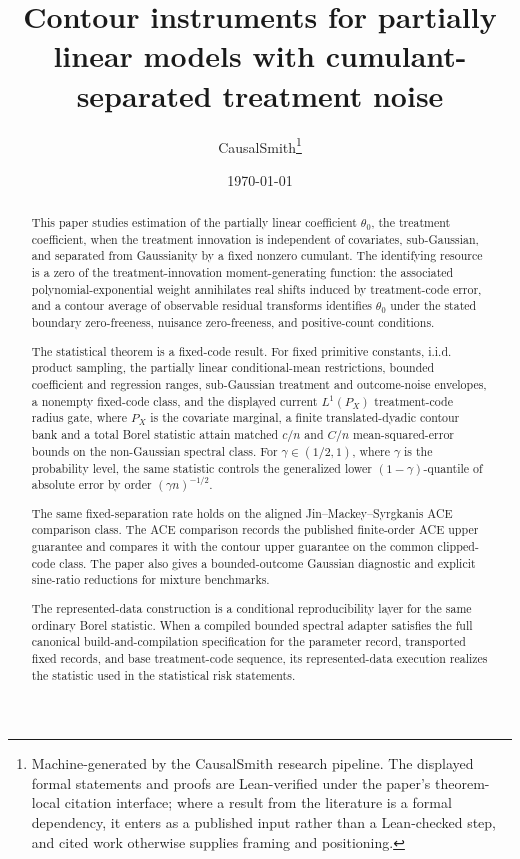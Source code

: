 \documentclass[11pt]{article}
\title{Contour instruments for partially linear models with cumulant-separated treatment noise}
\author{CausalSmith\thanks{Machine-generated by the CausalSmith research pipeline. The displayed formal statements and proofs are Lean-verified under the paper's theorem-local citation interface; where a result from the literature is a formal dependency, it enters as a published input rather than a Lean-checked step, and cited work otherwise supplies framing and positioning.}}
\date{\today}
\begin{document}
\maketitle

\begin{abstract}
This paper studies estimation of the partially linear coefficient \(\theta_0\), the treatment coefficient, when the treatment innovation is independent of covariates, sub-Gaussian, and separated from Gaussianity by a fixed nonzero cumulant. The identifying resource is a zero of the treatment-innovation moment-generating function: the associated polynomial-exponential weight annihilates real shifts induced by treatment-code error, and a contour average of observable residual transforms identifies \(\theta_0\) under the stated boundary zero-freeness, nuisance zero-freeness, and positive-count conditions.

The statistical theorem is a fixed-code result. For fixed primitive constants, i.i.d. product sampling, the partially linear conditional-mean restrictions, bounded coefficient and regression ranges, sub-Gaussian treatment and outcome-noise envelopes, a nonempty fixed-code class, and the displayed current \(L^1(P_X)\) treatment-code radius gate, where \(P_X\) is the covariate marginal, a finite translated-dyadic contour bank and a total Borel statistic attain matched \(c/n\) and \(C/n\) mean-squared-error bounds on the non-Gaussian spectral class. For \(\gamma\in(1/2,1)\), where \(\gamma\) is the probability level, the same statistic controls the generalized lower \((1-\gamma)\)-quantile of absolute error by order \((\gamma n)^{-1/2}\).

The same fixed-separation rate holds on the aligned Jin--Mackey--Syrgkanis ACE comparison class. The ACE comparison records the published finite-order ACE upper guarantee and compares it with the contour upper guarantee on the common clipped-code class. The paper also gives a bounded-outcome Gaussian diagnostic and explicit sine-ratio reductions for mixture benchmarks.

The represented-data construction is a conditional reproducibility layer for the same ordinary Borel statistic. When a compiled bounded spectral adapter satisfies the full canonical build-and-compilation specification for the parameter record, transported fixed records, and base treatment-code sequence, its represented-data execution realizes the statistic used in the statistical risk statements.
\end{abstract}
\end{document}
